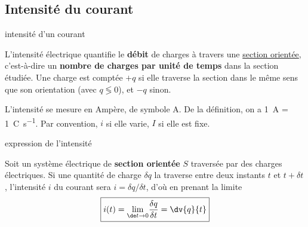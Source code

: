 \documentclass[../main/main.tex]{subfiles}
\begin{document}
\subsection{Intensité du courant}
\begin{tcbraster}[raster columns=3, raster equal height=rows]
    
\begin{defi}[label=def:intensité, sidebyside, raster multicolumn=2]{intensité
    d'un courant}

    L'intensité électrique quantifie le \textbf{débit} de charges à travers une
    \underline{section orientée}, c'est-à-dire un \textbf{nombre de charges par
    unité de temps} dans la section étudiée. Une charge est comptée $+q$
    si elle traverse la section dans le même sens que son orientation (avec $q
    \lessgtr 0$), et $-q$ sinon.

    \tcblower
    L'intensité se mesure en Ampère, de symbole A. De la définition, on a
    \SI{1}{A} = \SI{1}{C.s^{-1}}.
    Par convention, $i$ si elle varie, $I$ si elle est fixe.
\end{defi}
\begin{prop}[label=prop:intensité]{expression de l'intensité}

    Soit un système électrique de \textbf{section orientée} $S$ traversée par
    des charges électriques. Si une quantité de charge $\delta q$ la traverse
    entre deux instants $t$ et $t + \delta t$, l'intensité $i$ du courant sera
    $i = \delta q/\delta t$, d'où en prenant la limite
    \[ \boxed{i(t) = \underset{\de t\rightarrow0}{\lim} \frac{\delta q}{\delta t} =
    \dv{q}{t}}\]
\end{prop}
\end{tcbraster}
\end{document}
